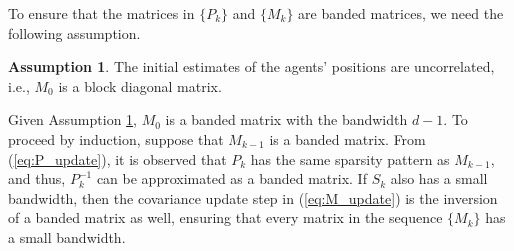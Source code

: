 \documentclass[twocolumn]{article}
\theoremstyle{plain}
\theoremstyle{definition}
\theoremstyle{definition}
\newtheorem{assumption}{Assumption}
\theoremstyle{remark}
\begin{document}
To ensure that the matrices in $\lbrace P_k\rbrace$ and $\lbrace M_k\rbrace$ are banded matrices, we need the following assumption.
\begin{assumption}
The initial estimates of the agents' positions are uncorrelated, i.e., $M_0$ is a block diagonal matrix.
\label{ass:init_cov}
\end{assumption}

Given Assumption \ref{ass:init_cov}, $M_0$ is a banded matrix with the bandwidth $d-1$. To proceed by induction, suppose that $M_{k-1}$ is a banded matrix.
From (\ref{eq:P_update}), it is observed that $P_k$ has the same sparsity pattern as $M_{k-1}$, and thus,
$P_k^{-1}$ can be approximated as a banded matrix. If $S_k$ also has a small bandwidth, then the covariance update step in (\ref{eq:M_update}) is the inversion of a banded matrix as well, ensuring that every matrix in the sequence $\lbrace M_k \rbrace$ has a small bandwidth. 
\end{document}
